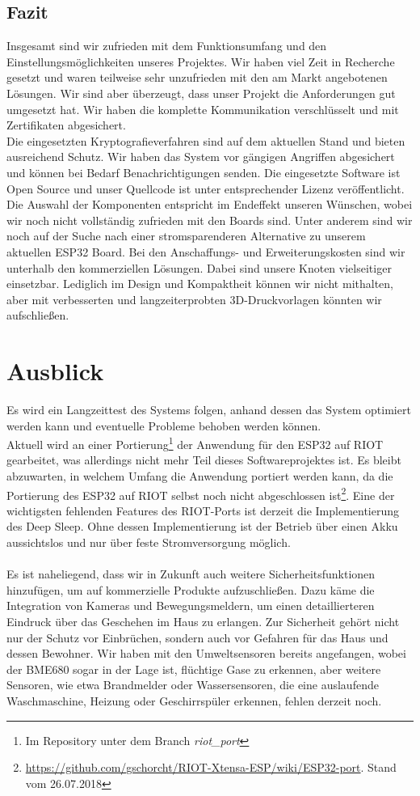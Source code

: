 \documentclass[a4paper,10pt,twocolumn]{article}
\begin{document}
\subsection{Fazit}
Insgesamt sind wir zufrieden mit dem Funktionsumfang und den Einstellungsmöglichkeiten unseres Projektes. Wir haben viel Zeit in Recherche gesetzt und waren teilweise sehr unzufrieden mit den am Markt angebotenen Lösungen. Wir sind aber überzeugt, dass unser Projekt die Anforderungen gut umgesetzt hat. Wir haben die komplette Kommunikation verschlüsselt und mit Zertifikaten abgesichert.\\
Die eingesetzten Kryptografieverfahren sind auf dem aktuellen Stand und bieten ausreichend Schutz. Wir haben das System vor gängigen Angriffen abgesichert und können bei Bedarf Benachrichtigungen senden. Die eingesetzte Software ist Open Source und unser Quellcode ist unter entsprechender Lizenz veröffentlicht.\\
Die Auswahl der Komponenten entspricht im Endeffekt unseren Wünschen, wobei wir noch nicht vollständig zufrieden mit den Boards sind. Unter anderem sind wir noch auf der Suche nach einer stromsparenderen Alternative zu unserem aktuellen ESP32 Board. Bei den Anschaffungs- und Erweiterungskosten sind wir unterhalb den kommerziellen Lösungen. Dabei sind unsere Knoten vielseitiger einsetzbar. Lediglich im Design und Kompaktheit können wir nicht mithalten, aber mit verbesserten und langzeiterprobten 3D-Druckvorlagen könnten wir aufschließen.

\section{Ausblick}
Es wird ein Langzeittest des Systems folgen, anhand dessen das System optimiert werden kann und eventuelle Probleme behoben werden können.\\
Aktuell wird an einer Portierung\footnote{Im Repository\cite{smarthome2} unter dem Branch \textit{riot\_port}} der Anwendung für den ESP32 auf RIOT gearbeitet, was allerdings nicht mehr Teil dieses Softwareprojektes ist. Es bleibt abzuwarten, in welchem Umfang die Anwendung portiert werden kann, da die Portierung des ESP32 auf RIOT selbst noch nicht abgeschlossen ist\footnote{\url{https://github.com/gschorcht/RIOT-Xtensa-ESP/wiki/ESP32-port}. Stand vom 26.07.2018}. Eine der wichtigsten fehlenden Features des RIOT-Ports ist derzeit die Implementierung des Deep Sleep. Ohne dessen Implementierung ist der Betrieb über einen Akku aussichtslos und nur über feste Stromversorgung möglich.\\\\
Es ist naheliegend, dass wir in Zukunft auch weitere Sicherheitsfunktionen hinzufügen, um auf kommerzielle Produkte aufzuschließen. Dazu käme die Integration von Kameras und Bewegungsmeldern, um einen detaillierteren Eindruck über das Geschehen im Haus zu erlangen. Zur Sicherheit gehört nicht nur der Schutz vor Einbrüchen, sondern auch vor Gefahren für das Haus und dessen Bewohner. Wir haben mit den Umweltsensoren bereits angefangen, wobei der BME680 sogar in der Lage ist, flüchtige Gase zu erkennen, aber weitere Sensoren, wie etwa Brandmelder oder Wassersensoren, die eine auslaufende Waschmaschine, Heizung oder Geschirrspüler erkennen, fehlen derzeit noch.

\nocite{*}


\end{document}
